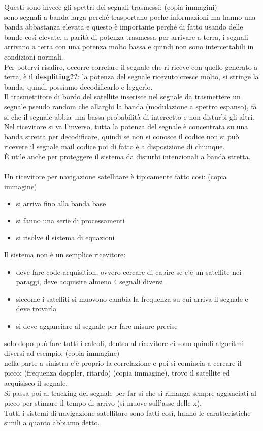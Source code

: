 \documentclass[oneside, 12pt]{extbook}
\begin{document}
Questi sono invece gli spettri dei segnali trasmessi: (copia immagini)\\
sono segnali a banda larga perché trasportano poche informazioni ma hanno una banda abbastanza elevata e questo è importante perché di fatto usando delle bande così elevate, a parità di potenza trasmessa per arrivare a terra, i segnali arrivano a terra con una potenza molto bassa e quindi non sono intercettabili in condizioni normali.\\
Per potervi risalire, occorre correlare il segnale che ri riceve con quello generato a terra, è il \textbf{despliting??}: la potenza del segnale ricevuto cresce molto, si stringe la banda, quindi possiamo decodificarlo e leggerlo.\\
Il trasmettitore di bordo del satellite inserisce nel segnale da trasmettere un segnale pseudo random che allarghi la banda (modulazione a spettro espanso), fa si che il segnale abbia una bassa probabilità di intercetto e non disturbi gli altri.\\
Nel ricevitore si va l'inverso, tutta la potenza del segnale è concentrata su una banda stretta per decodificare, quindi se non si conosce il codice non si può ricevere il segnale mail codice poi di fatto è a disposizione di chiunque.\\
È utile anche per proteggere il sistema da disturbi intenzionali a banda stretta.\\\\
Un ricevitore per navigazione satellitare è tipicamente fatto così:
(copia immagine)
\begin{itemize}
	\item si arriva fino alla banda base
	\item si fanno una serie di processamenti 
	\item si risolve il sistema di equazioni
\end{itemize}
Il sistema non è un semplice ricevitore:
\begin{itemize}
	\item deve fare code acquisition, ovvero cercare di capire se c'è un satellite nei paraggi, deve acquisire almeno 4 segnali diversi
	\item siccome i satelliti si muovono cambia la frequenza su cui arriva il segnale e deve trovarla
	\item si deve agganciare al segnale per fare misure precise
\end{itemize}
solo dopo può fare tutti i calcoli, dentro al ricevitore ci sono quindi algoritmi diversi ad esempio:
(copia immagine)\\
nella parte a sinistra c'è proprio la correlazione e poi si comincia a cercare il picco: (frequenza doppler, ritardo) (copia immagine), trovo il satellite ed acquisisco il segnale.\\
Si passa poi al tracking del segnale per far si che si rimanga sempre agganciati al picco per stimare il tempo di arrivo (si muove sull'asse delle x).\\
Tutti i sistemi di navigazione satellitare sono fatti così, hanno le caratteristiche simili a quanto abbiamo detto.
\end{document}
